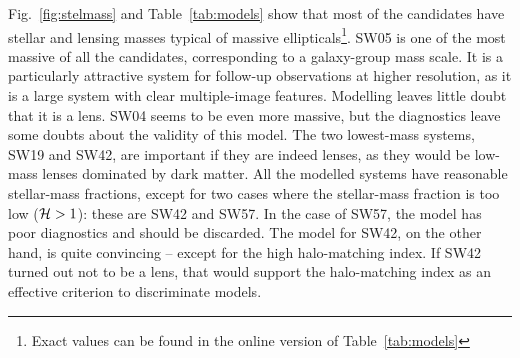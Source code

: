 Fig.~\ref{fig:stelmass} and Table~\ref{tab:models} show that most of the
candidates have stellar
and lensing masses typical of massive ellipticals\footnote{
  Exact values can be found in the online version of Table~\ref{tab:models}}.
SW05 is one of the most massive of all the candidates, corresponding
to a galaxy-group mass scale.  It is a particularly attractive system
for follow-up observations at higher resolution, as it is a large
system with clear multiple-image features. Modelling leaves little
doubt that it is a lens.  SW04 seems to be even more massive, but the
diagnostics leave some doubts about the validity of this model.  The
two lowest-mass systems, SW19 and SW42, are important if they are
indeed lenses, as they would be low-mass lenses dominated by dark
matter.  All the modelled systems have reasonable stellar-mass
fractions, except for two cases where the stellar-mass fraction is too
low ($\mathcal{H} > 1$): these are SW42 and SW57.  In the case of SW57,
the model has poor diagnostics and should be discarded.  The model
for SW42, on the other hand, is quite convincing -- except for the
high halo-matching index.  If SW42 turned out not to be a lens, that
would support the halo-matching index as an effective criterion to
discriminate models.

